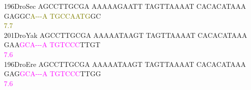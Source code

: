 \documentclass[11pt,twoside,reqno,a4paper]{article}
\begin{document}
{196\hspace*{1\charwidth}DroSec	AGCCTTGCGA	AAAAAGAATT	TAGTTAAAAT	CACACATAAA	GAGGC\textcolor{olive}{A}\textcolor{olive}{-}\textcolor{olive}{-}\textcolor{olive}{-}\textcolor{olive}{A}	\textcolor{olive}{T}\textcolor{olive}{G}\textcolor{olive}{C}\textcolor{olive}{C}\textcolor{olive}{A}\textcolor{olive}{A}\textcolor{olive}{T}\textcolor{olive}{G}GC	\\
\hspace*{4\charwidth}\hspace*{7\charwidth}\hspace*{1\charwidth}\hspace*{1\charwidth}\hspace*{1\charwidth}\hspace*{1\charwidth}\hspace*{45\charwidth}\textcolor{olive}{7.7}\hspace*{1\charwidth}\hspace*{1\charwidth}\\
201\hspace*{1\charwidth}DroYak	AGCCTTGCGA	AAAAATAAGT	TAGTTAAAAT	CACACATAAA	GAA\textcolor{magenta}{G}\textcolor{magenta}{C}\textcolor{magenta}{A}\textcolor{magenta}{-}\textcolor{magenta}{-}\textcolor{magenta}{-}\textcolor{magenta}{A}	\textcolor{magenta}{T}\textcolor{magenta}{G}\textcolor{magenta}{T}\textcolor{magenta}{C}\textcolor{magenta}{C}\textcolor{magenta}{C}TTGT	\\
\hspace*{4\charwidth}\hspace*{7\charwidth}\hspace*{1\charwidth}\hspace*{1\charwidth}\hspace*{1\charwidth}\hspace*{1\charwidth}\hspace*{43\charwidth}\textcolor{magenta}{7.6}\hspace*{1\charwidth}\hspace*{1\charwidth}\\
196\hspace*{1\charwidth}DroEre	AGCCTTGCGA	AAAAATAAGT	TAGTTAAAAT	CACACATAAA	GAG\textcolor{magenta}{G}\textcolor{magenta}{C}\textcolor{magenta}{A}\textcolor{magenta}{-}\textcolor{magenta}{-}\textcolor{magenta}{-}\textcolor{magenta}{A}	\textcolor{magenta}{T}\textcolor{magenta}{G}\textcolor{magenta}{T}\textcolor{magenta}{C}\textcolor{magenta}{C}\textcolor{magenta}{C}TTGG	\\
\hspace*{4\charwidth}\hspace*{7\charwidth}\hspace*{1\charwidth}\hspace*{1\charwidth}\hspace*{1\charwidth}\hspace*{1\charwidth}\hspace*{43\charwidth}\textcolor{magenta}{7.6}\hspace*{1\charwidth}\hspace*{1\charwidth}\\
}
\end{document}
